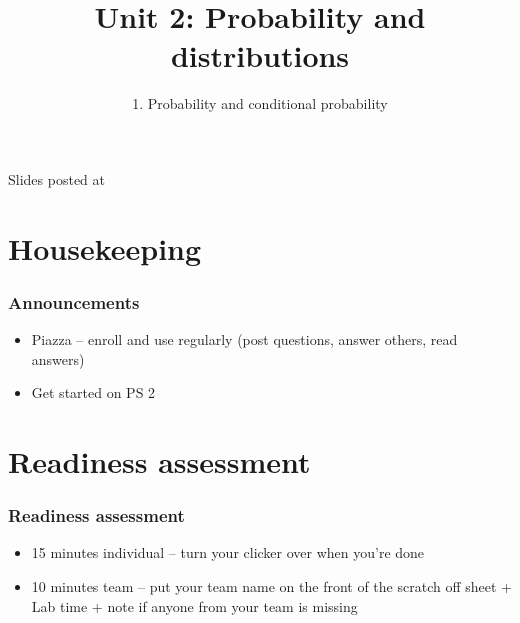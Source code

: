 \documentclass[11pt,containsverbatim,handout,xcolor=xelatex,dvipsnames,table]{beamer}
\title{Unit 2: Probability and distributions}
\subtitle{1. Probability and conditional probability}
\author{\CourseName}
\date{}
\institute{\InstituteName}
\begin{document}



\begin{frame}[plain]

\titlepage

\vfill

{\scriptsize {} \hfill Slides posted at  \webURL{\CourseSite}}

\addtocounter{framenumber}{-1} 

\end{frame}


\section{Housekeeping}


\begin{frame}
\frametitle{Announcements}

\begin{itemize}

\item Piazza -- enroll and use regularly (post questions, answer others, read answers)

\item Get started on PS 2

\end{itemize}

\end{frame}


\section{Readiness assessment}


\begin{frame}
\frametitle{Readiness assessment}

\begin{itemize}

\item 15 minutes individual -- turn your clicker over when you're done

\item 10 minutes team -- put your team name on the front of the scratch 
off sheet + Lab time + note if anyone from your team is missing

\end{itemize}

\end{frame}
\end{document}
